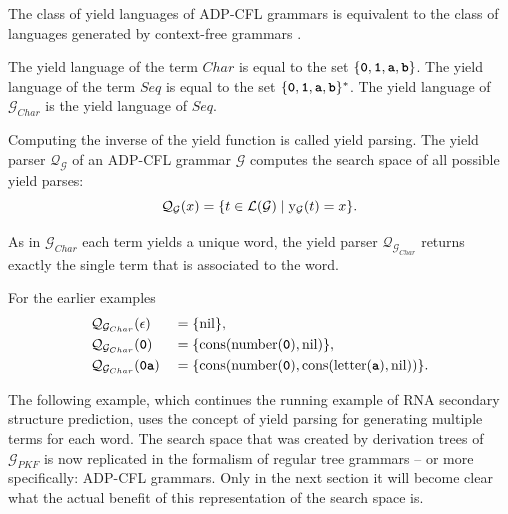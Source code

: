 \documentclass[
    a4paper,
    12pt,
    twoside,
    BCOR=12mm,
    parskip=half,
    chapterprefix,
    numbers=noenddot,
    bibliography=totoc
]{scrbook}
\begin{document}
The class of yield languages of ADP-CFL grammars is equivalent to the class of languages generated by context-free grammars \citep[Theorem 6]{giegerich_implementing_2002}.

\begin{example}[continues=ex:adp_cfl_chars]
	The yield language of the term $Char$ is equal to the set $\{\ts{0},\ts{1},\ts{a},\ts{b}\}$.
	The yield language of the term $Seq$ is equal to the set $\{\ts{0},\ts{1},\ts{a},\ts{b}\}^*$. The yield language of $\mathcal{G}_{Char}$ is the yield language of $Seq$.
\end{example}

Computing the inverse of the yield function is called yield parsing. The yield
parser $\mathcal{Q}_\mathcal{G}$ of an ADP-CFL grammar $\mathcal{G}$ computes the search space of all possible yield parses:
\begin{equation}
  \label{eq:yieldparsercfl}
	\mathcal{Q}_\mathcal{G}(x) = \{ t \in \mathcal{L}(\mathcal{G}) \mid \mathrm{y}_\mathcal{G}(t) = x \}.
\end{equation}

\begin{example}[continues=ex:adp_cfl_chars]
	As in $\mathcal{G}_{Char}$ each term yields a unique word, the yield parser $\mathcal{Q}_{\mathcal{G}_{Char}}$ returns exactly the single term that is associated to the word.
	
	For the earlier examples
	\begin{align*}
		&\mathcal{Q}_{\mathcal{G}_{Char}}(\epsilon) &&= \{\op{nil}\},\\
		&\mathcal{Q}_{\mathcal{G}_{Char}}(\ts{0}) &&= \{\op{cons}(\op{number}(\ts{0}),\op{nil})\},\\
		&\mathcal{Q}_{\mathcal{G}_{Char}}(\ts{0a}) &&= \{\op{cons}(\op{number}(\ts{0}),\op{cons}(\op{letter}(\ts{a}),\op{nil}))\}.
	\end{align*}
\end{example}

The following example, which continues the running example of RNA secondary structure prediction, uses the concept of yield parsing for generating multiple terms for each word. The search space that was created by derivation trees of $\mathcal{G}_{PKF}$ is now replicated in the formalism of regular tree grammars -- or more specifically: ADP-CFL grammars. Only in the next section it will become clear what the actual benefit of this representation of the search space is.
\end{document}
